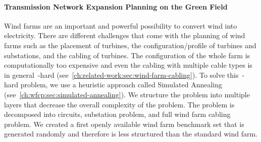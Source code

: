 \paragraph{Transmission Network Expansion Planning on the Green Field}%
% 
Wind farms are an important and powerful possibility to convert wind into
electricity. There are different challenges that come with the planning of wind
farms such as the placement of turbines, the configuration/profile of turbines
and substations, and the cabling of turbines. The configuration of the whole
farm is computationally too expensive and even the cabling with multiple cable
types is in general~\NP-hard (see~\cref{ch:related-work:sec:wind-farm-cabling}).
To solve this~\NP-hard problem, we use a heuristic approach called Simulated
Annealing (see~\cref{ch:wfcp:sec:simulated-annealing}). We structure the problem
into multiple layers that decrease the overall complexity of the problem. The
problem is decomposed into circuits, substation problem, and full wind farm
cabling problem. We created a first openly available wind farm benchmark set
that is generated randomly and therefore is less structured than the standard
wind farm.
% 
